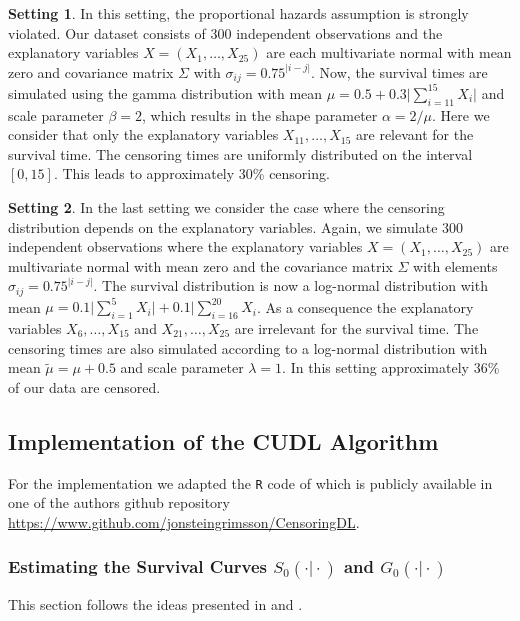 \documentclass[12pt, a4paper]{scrartcl}
\theoremstyle{definition}
\newtheorem{setting}{Setting}
\theoremstyle{plain}
\numberwithin{equation}{section}
\numberwithin{figure}{section}
\numberwithin{table}{section}
\begin{document}
	\begin{setting}
		In this setting, the proportional hazards assumption is strongly violated.
		Our dataset consists of 300 independent observations and the explanatory variables $X=(X_1,\dots,X_{25})$ are each multivariate normal with mean zero and covariance matrix $\Sigma$ with $\sigma_{ij}=0.75^{\vert i-j\vert}$.
		Now, the survival times are simulated using the gamma distribution with  mean $\mu = 0.5 + 0.3 \vert \sum_{i=11}^{15} X_i \vert$ and scale parameter $\beta = 2$, which results in the shape parameter $\alpha = 2/\mu$.
		Here we consider that only the explanatory variables $X_{11},\dots,X_{15}$ are relevant for the survival time.
		The censoring times are uniformly distributed on the interval $[0,15]$.
		This leads to approximately 30\% censoring.
	\end{setting}

	\begin{setting}
		In the last setting we consider the case where the censoring distribution depends on the explanatory variables.
		Again, we simulate 300 independent observations where the explanatory variables $X=(X_1,\dots,X_{25})$ are multivariate normal with mean zero and the covariance matrix $\Sigma$ with elements $\sigma_{ij}=0.75^{\vert i-j\vert}$.
		The survival distribution is now a log-normal distribution with mean $\mu = 0.1 \vert \sum_{i=1}^5 X_i \vert + 0.1 \vert \sum_{i=16}^{20}X_i$.
		As a consequence the explanatory variables $X_{6},\dots,X_{15}$ and $X_{21},\dots,X_{25}$ are irrelevant for the survival time.
		The censoring times are also simulated according to a log-normal distribution with mean $\tilde{\mu}=\mu+0.5$ and scale parameter $\lambda = 1$.
		In this setting approximately 36\% of our data are censored.
	\end{setting}
			
	\subsection{Implementation of the CUDL Algorithm}\label{impl}
	For the implementation we adapted the \texttt{R} code of \citet*{basearticle} which is publicly available in one of the authors github repository \url{https://www.github.com/jonsteingrimsson/CensoringDL}.
		
	\subsubsection{Estimating the Survival Curves $S_0(\cdot\vert\cdot)$ and $G_0(\cdot\vert\cdot)$}\label{estsurv}
	This section follows the ideas presented in \citet*{drcut} and \citet*{drtrees}.
	
\end{document}
